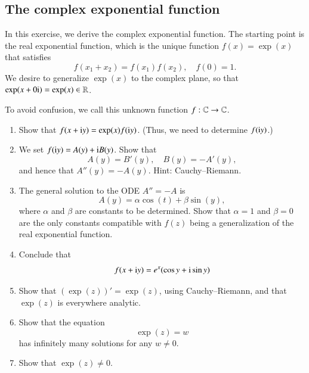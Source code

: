 \documentclass[12pt]{report}
\begin{document}
\subsection{The complex exponential function}

In this exercise, we derive the complex exponential function. The starting point is the real exponential function, which is the unique function $f(x) = \exp(x)$ that satisfies
\begin{equation}
    f(x_1 + x_2) = f(x_1)f(x_2), \quad f(0) = 1.
\end{equation}
We desire to generalize $\exp(x)$ to the complex plane, so that $\exp(x + 0\mathrm{i}) = \exp(x) \in \mathbb{R}$.

To avoid confusion, we call this unknown function $f : \mathbb{C} \to \mathbb{C}$.
\begin{enumerate}
    \item Show that $f(x + \mathrm{i} y) = \exp(x) f(\mathrm{i} y)$. (Thus, we need to determine $f(\mathrm{i} y)$.)
    \item We set $f(\mathrm{i} y) = A(y) + \mathrm{i} B(y)$. Show that 
    \begin{equation}
        A(y) =  B'(y), \quad B(y) = - A'(y),
    \end{equation}
    and hence that $A''(y) = -A(y)$. Hint: Cauchy--Riemann.
    \item The general solution to the ODE $A'' = -A$ is
    \begin{equation}
        A(y) = \alpha \cos(t) + \beta\sin(y),
    \end{equation}
    where $\alpha$ and $\beta$ are constants to be determined. Show that $\alpha = 1$ and $\beta = 0$ are the only constants compatible with $f(z)$ being a generalization of the real exponential function.
    \item Conclude that
    \begin{equation}
        f(x + \mathrm{i} y) = e^x(\cos y + \mathrm{i} \sin y)
    \end{equation}
    \item Show that $(\exp(z))' = \exp(z)$, using Cauchy--Riemann, and that $\exp(z)$ is everywhere analytic.
    \item Show that the equation
    \begin{equation}
        \exp(z) = w
    \end{equation}
    has infinitely many solutions for any $w\neq 0$.
    \item Show that $\exp(z) \neq 0$.
\end{enumerate}
\end{document}
